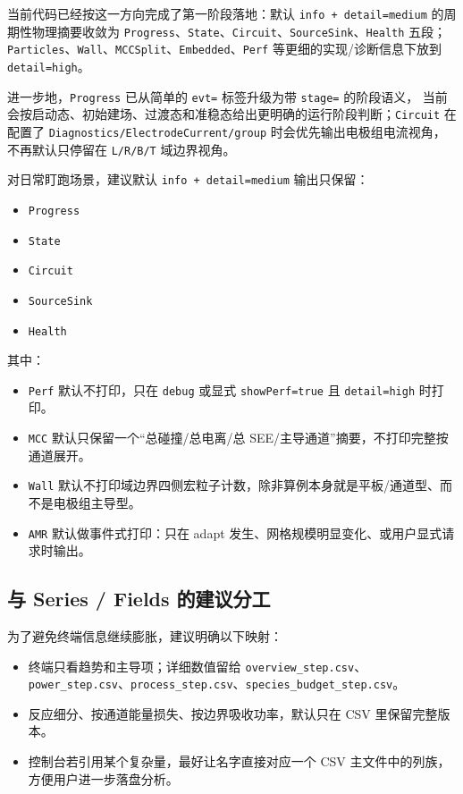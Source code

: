 \documentclass[11pt,a4paper]{ctexart}
\newcommand{\code}[1]{\texttt{#1}}
\begin{document}
当前代码已经按这一方向完成了第一阶段落地：默认 \code{info + detail=medium}
的周期性物理摘要收敛为 \code{Progress}、\code{State}、\code{Circuit}、\code{SourceSink}、\code{Health}
五段；\code{Particles}、\code{Wall}、\code{MCCSplit}、\code{Embedded}、\code{Perf}
等更细的实现/诊断信息下放到 \code{detail=high}。

进一步地，\code{Progress} 已从简单的 \code{evt=} 标签升级为带 \code{stage=} 的阶段语义，
当前会按启动态、初始建场、过渡态和准稳态给出更明确的运行阶段判断；\code{Circuit}
 在配置了 \code{Diagnostics/ElectrodeCurrent/group} 时会优先输出电极组电流视角，
不再默认只停留在 \code{L/R/B/T} 域边界视角。

对日常盯跑场景，建议默认 \code{info + detail=medium} 输出只保留：

\begin{itemize}
  \item \code{Progress}
  \item \code{State}
  \item \code{Circuit}
  \item \code{SourceSink}
  \item \code{Health}
\end{itemize}

其中：

\begin{itemize}
  \item \code{Perf} 默认不打印，只在 \code{debug} 或显式 \code{showPerf=true} 且 \code{detail=high} 时打印。
  \item \code{MCC} 默认只保留一个``总碰撞/总电离/总 SEE/主导通道''摘要，不打印完整按通道展开。
  \item \code{Wall} 默认不打印域边界四侧宏粒子计数，除非算例本身就是平板/通道型、而不是电极组主导型。
  \item \code{AMR} 默认做事件式打印：只在 adapt 发生、网格规模明显变化、或用户显式请求时输出。
\end{itemize}

\subsection{与 Series / Fields 的建议分工}

为了避免终端信息继续膨胀，建议明确以下映射：

\begin{itemize}
  \item 终端只看趋势和主导项；详细数值留给 \code{overview\_step.csv}、\code{power\_step.csv}、\code{process\_step.csv}、\code{species\_budget\_step.csv}。
  \item 反应细分、按通道能量损失、按边界吸收功率，默认只在 CSV 里保留完整版本。
  \item 控制台若引用某个复杂量，最好让名字直接对应一个 CSV 主文件中的列族，方便用户进一步落盘分析。
\end{itemize}
\end{document}
